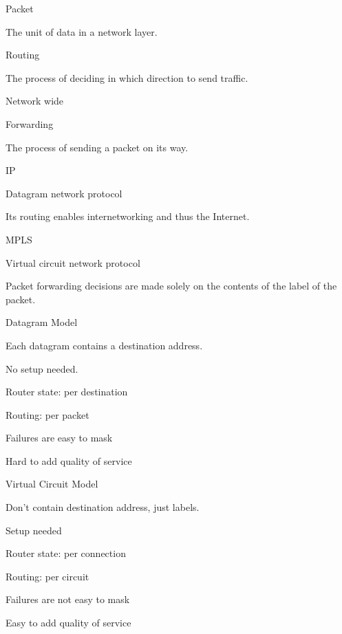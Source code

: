 \documentclass[main.tex]{subfiles}
\begin{document}
\small


\begin{card}{Packet}
\item The unit of data in a network layer.
\end{card}

\begin{card}{Routing}
\item The process of deciding in which direction to send traffic.
\item Network wide
\end{card}

\begin{card}{Forwarding}
\item The process of sending a packet on its way.
\end{card}

\begin{card}{IP}
\item Datagram network protocol
\item Its routing enables internetworking and thus the Internet.
\end{card}

\begin{card}{MPLS}
\item Virtual circuit network protocol
\item Packet forwarding decisions are made solely on the contents of the label of the packet.
\end{card}

\begin{card}{Datagram Model}
\item Each datagram contains a destination address.
\item No setup needed.
\item Router state: per destination
\item Routing: per packet
\item Failures are easy to mask
\item Hard to add quality of service
\end{card}

\begin{card}{Virtual Circuit Model}
\item Don't contain destination address, just labels.
\item Setup needed
\item Router state: per connection
\item Routing: per circuit
\item Failures are not easy to mask
\item Easy to add quality of service
\end{card}
\end{document}
